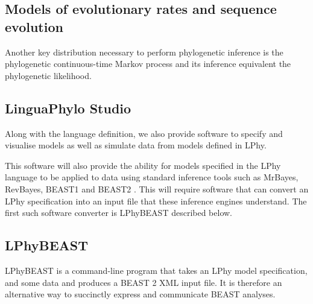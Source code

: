\documentclass[oneside]{article}
\begin{document}
\subsection{Models of evolutionary rates and sequence evolution}

Another key distribution necessary to perform phylogenetic inference
is the phylogenetic continuous-time Markov process and its inference
equivalent the phylogenetic likelihood.

\subsection{LinguaPhylo Studio}

Along with the language definition, we also provide software to
specify and visualise models as well as simulate data from models
defined in LPhy.

This software will also provide the ability for models specified in
the LPhy language to be applied to data using standard inference tools
such as MrBayes, RevBayes, BEAST1 and BEAST2
\cite{bouckaert2014beastanalysis,DrummondBouckaert2015,bouckaert2019beastanalysis}.
This will require software that can convert an LPhy specification into
an input file that these inference engines understand.
The first such software converter is LPhyBEAST described below.

\subsection{LPhyBEAST}

LPhyBEAST is a command-line program that takes an LPhy model
specification, and some data and produces a BEAST 2 XML input file.
It is therefore an alternative way to succinctly express and
communicate BEAST analyses. 



\end{document}
